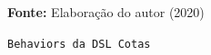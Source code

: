 \begin{figure}[ht!]
\centering

\caption{\textmd{\texttt{Behaviors da DSL Cotas}}}
\label{fig:behaviorlista}

\par\medskip\textbf{Fonte:} Elaboração do autor (2020) \par\medskip

\end{figure}

